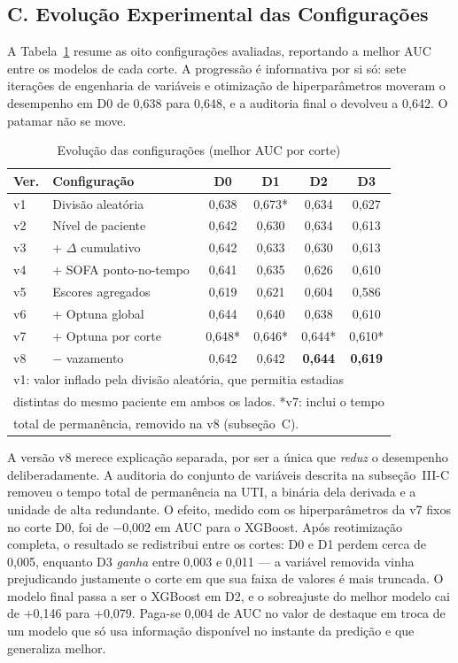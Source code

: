 \documentclass{ieeeaccess}
\begin{document}
\subsection*{C. Evolução Experimental das Configurações}
A Tabela~\ref{tab:evolucao} resume as oito configurações avaliadas, reportando a melhor AUC entre os modelos de cada corte. A progressão é informativa por si só: sete iterações de engenharia de variáveis e otimização de hiperparâmetros moveram o desempenho em D0 de 0,638 para 0,648, e a auditoria final o devolveu a 0,642. O patamar não se move.

\begin{table}[!t]
\caption{Evolução das configurações (melhor AUC por corte)}
\label{tab:evolucao}
\centering
\footnotesize
\begin{tabular}{llcccc}
\hline
\textbf{Ver.} & \textbf{Configuração} & \textbf{D0} & \textbf{D1} & \textbf{D2} & \textbf{D3} \\
\hline
v1 & Divisão aleatória      & 0,638 & 0,673* & 0,634 & 0,627 \\
v2 & Nível de paciente      & 0,642 & 0,630 & 0,634 & 0,613 \\
v3 & + $\Delta$ cumulativo  & 0,642 & 0,633 & 0,630 & 0,613 \\
v4 & + SOFA ponto-no-tempo  & 0,641 & 0,635 & 0,626 & 0,610 \\
v5 & Escores agregados      & 0,619 & 0,621 & 0,604 & 0,586 \\
v6 & + Optuna global        & 0,644 & 0,640 & 0,638 & 0,610 \\
v7 & + Optuna por corte     & 0,648* & 0,646* & 0,644* & 0,610* \\
v8 & $-$ vazamento         & 0,642 & 0,642 & \textbf{0,644} & \textbf{0,619} \\
\hline
\multicolumn{6}{l}{\footnotesize v1: valor inflado pela divisão aleatória, que permitia estadias} \\
\multicolumn{6}{l}{\footnotesize distintas do mesmo paciente em ambos os lados. *v7: inclui o tempo} \\
\multicolumn{6}{l}{\footnotesize total de permanência, removido na v8 (subseção~C).} \\
\end{tabular}
\end{table}

A versão v8 merece explicação separada, por ser a única que \textit{reduz} o desempenho deliberadamente. A auditoria do conjunto de variáveis descrita na subseção~III-C removeu o tempo total de permanência na UTI, a binária dela derivada e a unidade de alta redundante. O efeito, medido com os hiperparâmetros da v7 fixos no corte D0, foi de $-$0,002 em AUC para o XGBoost. Após reotimização completa, o resultado se redistribui entre os cortes: D0 e D1 perdem cerca de 0,005, enquanto D3 \textit{ganha} entre 0,003 e 0,011 --- a variável removida vinha prejudicando justamente o corte em que sua faixa de valores é mais truncada. O modelo final passa a ser o XGBoost em D2, e o sobreajuste do melhor modelo cai de +0,146 para +0,079. Paga-se 0,004 de AUC no valor de destaque em troca de um modelo que só usa informação disponível no instante da predição e que generaliza melhor.
\end{document}
